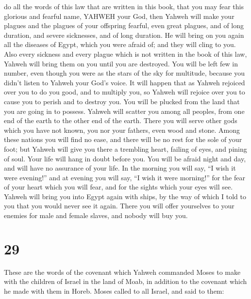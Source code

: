 do all the words of this law that are written in this book, that you may
fear this glorious and fearful name, YAHWEH your God, 
then Yahweh will make your plagues and the plagues of your offspring
fearful, even great plagues, and of long duration, and severe
sicknesses, and of long duration.  He will bring on you
again all the diseases of Egypt, which you were afraid of; and they will
cling to you.  Also every sickness and every plague which
is not written in the book of this law, Yahweh will bring them on you
until you are destroyed.  You will be left few in number,
even though you were as the stars of the sky for multitude, because you
didn't listen to Yahweh your God's voice.  It will happen
that as Yahweh rejoiced over you to do you good, and to multiply you, so
Yahweh will rejoice over you to cause you to perish and to destroy you.
You will be plucked from the land that you are going in to possess.
 Yahweh will scatter you among all peoples, from one end
of the earth to the other end of the earth. There you will serve other
gods which you have not known, you nor your fathers, even wood and
stone.  Among these nations you will find no ease, and
there will be no rest for the sole of your foot; but Yahweh will give
you there a trembling heart, failing of eyes, and pining of soul.
 Your life will hang in doubt before you. You will be
afraid night and day, and will have no assurance of your life.
 In the morning you will say, ``I wish it were evening!''
and at evening you will say, ``I wish it were morning!'' for the fear of
your heart which you will fear, and for the sights which your eyes will
see.  Yahweh will bring you into Egypt again with ships,
by the way of which I told to you that you would never see it again.
There you will offer yourselves to your enemies for male and female
slaves, and nobody will buy you.

\hypertarget{section-28}{%
\section{29}\label{section-28}}

 These are the words of the covenant which Yahweh
commanded Moses to make with the children of Israel in the land of Moab,
in addition to the covenant which he made with them in Horeb.
 Moses called to all Israel, and said to them:


